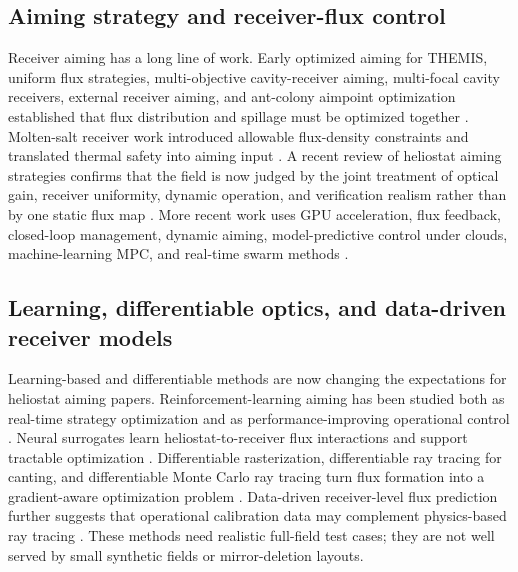 \documentclass[final,3p,times]{elsarticle}
\begin{document}
\subsection{Aiming strategy and receiver-flux control}
Receiver aiming has a long line of work. Early optimized aiming for THEMIS, uniform flux strategies, multi-objective cavity-receiver aiming, multi-focal cavity receivers, external receiver aiming, and ant-colony aimpoint optimization established that flux distribution and spillage must be optimized together \cite{salome2013themis,besarati2014uniform,wang2017nsga,yu2014multifocal,astolfi2017external,belhomme2014ant}. Molten-salt receiver work introduced allowable flux-density constraints and translated thermal safety into aiming input \cite{sanchez2017towards,sanchez2017allowable,sanchez2020allowable}. A recent review of heliostat aiming strategies confirms that the field is now judged by the joint treatment of optical gain, receiver uniformity, dynamic operation, and verification realism rather than by one static flux map \cite{li2026aimingreview}. More recent work uses GPU acceleration, flux feedback, closed-loop management, dynamic aiming, model-predictive control under clouds, machine-learning MPC, and real-time swarm methods \cite{oberkirsch2021gpu,acosta2021fluxfeedback,oberkirsch2023closedloop,richter2021dynamic,zhu2023mpc,wu2026mlmpc,zhu2024swarm}.

\subsection{Learning, differentiable optics, and data-driven receiver models}
Learning-based and differentiable methods are now changing the expectations for heliostat aiming papers. Reinforcement-learning aiming has been studied both as real-time strategy optimization and as performance-improving operational control \cite{cruz2022rl,carballo2025rl}. Neural surrogates learn heliostat-to-receiver flux interactions and support tractable optimization \cite{alcantara2025nn}. Differentiable rasterization, differentiable ray tracing for canting, and differentiable Monte Carlo ray tracing turn flux formation into a gradient-aware optimization problem \cite{zheng2025diffneg,grange2025canting,lin2025dmcrt}. Data-driven receiver-level flux prediction further suggests that operational calibration data may complement physics-based ray tracing \cite{schiricke2025fluxprediction}. These methods need realistic full-field test cases; they are not well served by small synthetic fields or mirror-deletion layouts.
\end{document}
